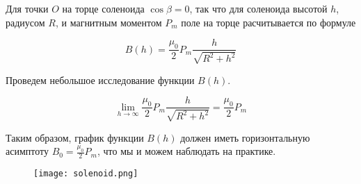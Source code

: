     Для точки $O$ на торце соленоида $\cos \beta = 0$, так что для соленоида высотой $h$, радиусом $R$, и магнитным моментом
    $P_m$ поле на торце расчитывается по формуле

    \begin{equation*}
        B(h) = \frac{\mu_0}{2} P_m \frac{h}{\sqrt{R^2 + h^2}}
    \end{equation*}

    Проведем небольшое исследование функции $B(h)$.

    \begin{equation*}
        \lim_{h \rightarrow \infty} \frac{\mu_0}{2} P_m \frac{h}{\sqrt{R^2 + h^2}} = \frac{\mu_0}{2} P_m
    \end{equation*}

    Таким образом, график функции $B(h)$ должен иметь горизонтальную асимптоту $B_0 = \frac{\mu_0}{2} P_m$, что мы и можем
    наблюдать на практике.

    \newpage
    \begin{figure}[h!]
        \centering
        \texttt{[image: solenoid.png]}
        \caption{}
    \end{figure}

